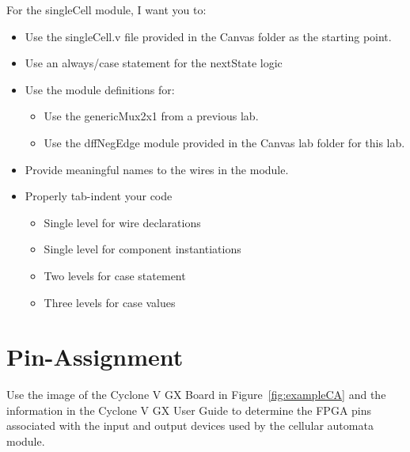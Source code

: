 \protect\hypertarget{singleCell_verilog}{}{}For the singleCell module, I
want you to:

\begin{itemize}
\item
  Use the singleCell.v file provided in the Canvas folder as the
  starting point.
\item
  Use an always/case statement for the nextState logic
\item
  Use the module definitions for:

  \begin{itemize}
  \item
    Use the genericMux2x1 from a previous lab.
  \item
    Use the dffNegEdge module provided in the Canvas lab folder for this
    lab.
  \end{itemize}
\item
  Provide meaningful names to the wires in the module.
\item
  Properly tab-indent your code

  \begin{itemize}
  \item
    Single level for wire declarations
  \item
    Single level for component instantiations
  \item
    Two levels for case statement
  \item
    Three levels for case values
  \end{itemize}
\end{itemize}


\section{Pin-Assignment}

Use the image of the Cyclone V GX Board in Figure~\ref{fig:exampleCA} 
and the information
in the Cyclone V GX User Guide to determine the FPGA pins associated
with the input and output devices used by the cellular automata module.


